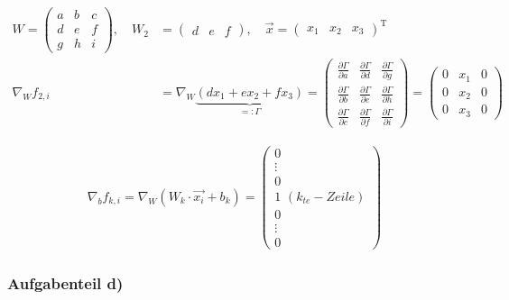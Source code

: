 \documentclass[11pt]{article}
\begin{document}
\[\begin{aligned}
W= \begin{pmatrix} a & b & c \\ d & e & f \\ g & h & i \end{pmatrix}, \quad W_2 &= \begin{pmatrix}  d & e & f \end{pmatrix}, \quad \vec{x} = \begin{pmatrix} x_1 & x_2 & x_3 \end{pmatrix}^{\mathrm{T}} \\
\nabla_W f_{2,i} &= \nabla_W \underbrace{\left( dx_1 + ex_2 +fx_3 \right)}_{=:\Gamma} =\begin{pmatrix}  \frac{\partial \Gamma}{\partial a}  & \frac{\partial \Gamma}{\partial d} & \frac{\partial \Gamma}{\partial g} \\ 
\frac{\partial \Gamma}{\partial b} & \frac{\partial \Gamma}{\partial e} & \frac{\partial \Gamma}{\partial h} \\ \frac{\partial \Gamma}{\partial c} & \frac{\partial \Gamma}{\partial f} & \frac{\partial \Gamma}{\partial i} \end{pmatrix} = \begin{pmatrix} 0 & x_1 & 0 \\ 0 & x_2 & 0 \\ 0 & x_3 & 0 \end{pmatrix}
\end{aligned}\]

\[\begin{aligned}
\nabla_b f_{k,i} = \nabla_W \left(W_k \cdot \vec{x_i} + b_k\right) = \begin{pmatrix} 0 \\ \vdots \\ 0 \\ 1 \, \,(k_{te} -Zeile) \\ 0 \\ \vdots \\ 0 \end{pmatrix}
\end{aligned}\]

    \hypertarget{aufgabenteil-d}{%
\subsubsection{Aufgabenteil d)}\label{aufgabenteil-d}}
\end{document}
